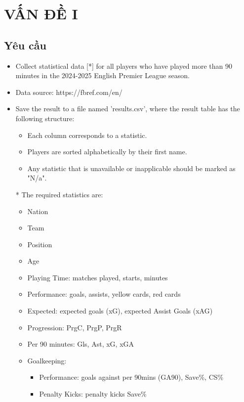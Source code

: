 \documentclass[12pt]{report}
\begin{document}
\chapter{VẤN ĐỀ I}
{
\section{Yêu cầu}
\begin{itemize}
	\item Collect statistical data [*] for all players who have played more than 90 minutes in the 2024-2025 English Premier League season.
	\item Data source: https://fbref.com/en/
	\item Save the result to a file named 'results.csv', where the result table has the following structure:
	\begin{itemize}
		\item Each column corresponds to a statistic.
		\item Players are sorted alphabetically by their first name.
		\item Any statistic that is unavailable or inapplicable should be marked as "N/a".
	\end{itemize}
\end{itemize}
\begin{itemize}
    \item[*] The required statistics are:
    \begin{itemize}
        \item Nation
        \item Team
        \item Position
        \item Age
        \item Playing Time: matches played, starts, minutes
        \item Performance: goals, assists, yellow cards, red cards
        \item Expected: expected goals (xG), expected Assist Goals (xAG)
        \item Progression: PrgC, PrgP, PrgR
        \item Per 90 minutes: Gls, Ast, xG, xGA
        \item Goalkeeping:
        \begin{itemize}
            \item Performance: goals against per 90mins (GA90), Save\%, CS\%
            \item Penalty Kicks: penalty kicks Save\%
        \end{itemize}

\end{itemize}
\end{itemize}}
\end{document}
